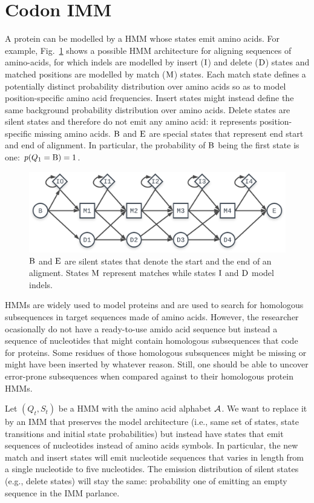 \section{Codon IMM}

A protein can be modelled by a HMM whose states emit amino acids. For example,
Fig.~\ref{fig:core-model} shows a possible HMM architecture for aligning sequences of amino-acids,
for which indels are modelled by insert ($\mathrm{I}$) and delete ($\mathrm{D}$) states and matched
positions are modelled by match ($\mathrm{M}$) states. Each match state defines a potentially
distinct probability distribution over amino acids so as to model position-specific amino acid
frequencies. Insert states might instead define the same background probability distribution over
amino acids. Delete states are silent states and therefore do not emit any amino acid: it represents
position-specific missing amino acids. $\mathrm{B}$ and $\mathrm{E}$ are special states that represent
end start and end of alignment. In particular, the probability of $\mathrm{B}$ being the first state
is one: $p(Q_1=\mathrm{B})=1$.

\begin{figure}[htbp]
  \centering
  \includegraphics[width=.7\linewidth]{figure/core-model}
  \caption{$\mathrm{B}$ and $\mathrm{E}$ are silent states that denote the start and the end of an
  aligment. States $\mathrm{M}$ represent matches while states $\mathrm{I}$ and $\mathrm{D}$ model
  indels.}\label{fig:core-model}
\end{figure}

HMMs are widely used to model proteins and are used to search for homologous subsequences in target
sequences made of amino acids. However, the researcher ocasionally do not have a ready-to-use amido
acid sequence but instead a sequence of nucleotides that might contain homologous subsequences that
code for proteins. Some residues of those homologous subsquences might be missing or might have been
inserted by whatever reason. Still, one should be able to uncover error-prone subsequences when
compared against to their homologous protein HMMs.

Let $(Q_t, S_t)$ be a HMM with the amino acid alphabet $\mathcal{A}$. We want to replace it by an IMM
that preserves the model architecture (i.e., same set of states, state transitions and initial state
probabilities) but instead have states that emit sequences of nucleotides instead of amino acids
symbols. In particular, the new match and insert states will emit nucleotide sequences that varies
in length from a single nucleotide to five nucleotides. The emission distribution of silent states
(e.g., delete states) will stay the same: probability one of emitting an empty sequence in the IMM
parlance.

